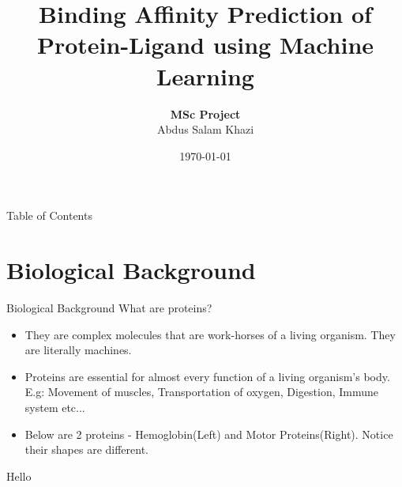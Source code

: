 \documentclass{beamer}
\title[PL Binding affinity prediction using ML]{Binding Affinity Prediction of Protein-Ligand using Machine Learning}
\author[Abdus Salam Khazi]
{
    \textbf{MSc Project}\\
    Abdus Salam Khazi
}
\institute{Supervisors: \\
            \begin{tabular}{ll}
		    	Simon Bray \& Alireza Khanteymoori
		    \end{tabular}
}
\date{\today}
\begin{document}
\begin{frame}
\titlepage
\end{frame}

\begin{frame}{Table of Contents}
\tableofcontents
\end{frame}

\section{Biological Background}

\begin{frame}[t]{Biological Background}
What are proteins? 
\begin{itemize}
\item They are complex molecules that are work-horses of a living organism.
They are literally machines.

\item Proteins are essential for almost every function of a living organism's body.
E.g: Movement of muscles, Transportation of oxygen, Digestion, Immune system etc...

\item Below are 2 proteins - Hemoglobin(Left) and Motor Proteins(Right).
Notice their shapes are different. 

\end{itemize}
\end{frame}

\begin{frame}
Hello
\end{frame}
\end{document}

